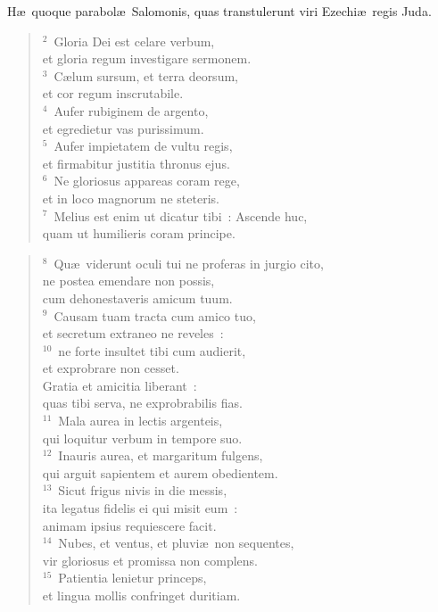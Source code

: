 \lettrine[lines=3,image=true,loversize=0.05,lraise=-0.03]{H}{}\ae\ quoque parabol\ae\ Salomonis, quas transtulerunt viri Ezechi\ae\ regis Juda.
\begin{flushleft}\begin{verse}\vspace{6pt}${}^{2}$~Gloria Dei est celare verbum,\\ et gloria regum investigare sermonem.\\
${}^{3}$~C\ae lum sursum, et terra deorsum,\\ et cor regum inscrutabile.\\
${}^{4}$~Aufer rubiginem de argento,\\ et egredietur vas purissimum.\\
${}^{5}$~Aufer impietatem de vultu regis,\\ et firmabitur justitia thronus ejus.\\
${}^{6}$~Ne gloriosus appareas coram rege,\\ et in loco magnorum ne steteris.\\
${}^{7}$~Melius est enim ut dicatur tibi~: Ascende huc,\\ quam ut humilieris coram principe.\end{verse}\end{flushleft}


\begin{flushleft}\begin{verse}${}^{8}$~Qu\ae\ viderunt oculi tui ne proferas in jurgio cito,\\ ne postea emendare non possis,\\ cum dehonestaveris amicum tuum.\\
${}^{9}$~Causam tuam tracta cum amico tuo,\\ et secretum extraneo ne reveles~:\\
${}^{10}$~ne forte insultet tibi cum audierit,\\ et exprobrare non cesset.\\ Gratia et amicitia liberant~:\\ quas tibi serva, ne exprobrabilis fias.\\
${}^{11}$~Mala aurea in lectis argenteis,\\ qui loquitur verbum in tempore suo.\\
${}^{12}$~Inauris aurea, et margaritum fulgens,\\ qui arguit sapientem et aurem obedientem.\\
${}^{13}$~Sicut frigus nivis in die messis,\\ ita legatus fidelis ei qui misit eum~:\\ animam ipsius requiescere facit.\\
${}^{14}$~Nubes, et ventus, et pluvi\ae\ non sequentes,\\ vir gloriosus et promissa non complens.\\
${}^{15}$~Patientia lenietur princeps,\\ et lingua mollis confringet duritiam.\end{verse}\end{flushleft}



